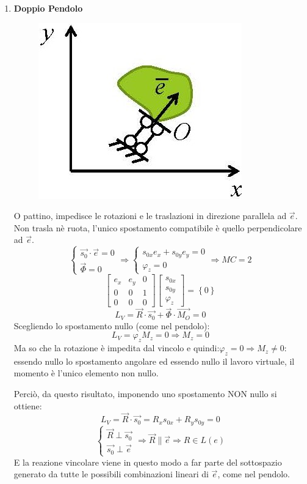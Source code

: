 \documentclass{article}
\begin{document}
\begin{adjustwidth}{2in}{}
\begin{enumerate}
\item \textbf{Doppio Pendolo}\newline
\begin{figure}[H]
	\centering
	\includegraphics[width=0.25\linewidth]{"immagini/1.PARTE1_Pagina_36"}
\end{figure}
O pattino, impedisce le rotazioni e le traslazioni in direzione parallela ad $\vec{e}$. Non trasla nè ruota, l'unico spostamento compatibile è quello perpendicolare ad $\vec{e}$.
\[ 
\begin{cases}
	\vec{s_{0}} \cdot \vec{e} = 0 \\
	\vec{\Phi} = 0
\end{cases}
\Rightarrow \begin{cases} s_{0x}e_{x} + s_{0y}e_{y}= 0 \\
	\varphi_{z} = 0 
\end{cases}\Rightarrow MC = 2
\]
	\[ 
\left[\begin{array}{ccc}
	e_{x} & e_{y} & 0 \\
	0 & 0 & 1 \\
	0 & 0 & 0
\end{array}\right] \left[ \begin{array}{c}
	s_{0x} \\
	s_{0y} \\
	\varphi_{z}
\end{array}\right] = \left\lbrace 0 \right\rbrace
\]
\[
L_{V} = \vec{R} \cdot \vec{s_{0}}  + \vec{\Phi} \cdot \vec{M_{O}} = 0
\]
Scegliendo lo spostamento nullo (come nel pendolo): 
\[
L_{V} =  \varphi_{z}M_{z} = 0 \Rightarrow M_{z} = 0
\]
Ma so che la rotazione è impedita dal vincolo e quindi:$\varphi_{z}=0 \Rightarrow M_{z} \ne 0$: essendo nullo lo spostamento angolare ed essendo nullo il lavoro virtuale, il momento è l'unico elemento non nullo.


Perciò, da questo risultato, imponendo uno spostamento NON nullo si ottiene: 
\[
L_{V} = \vec{R} \cdot \vec{s_{0}}  =  R_{x}s_{0x} + R_{y}s_{0y} = 0 
\]
\[ 
\begin{cases}
	\vec{R} \perp \vec{s_{0}} \\
	\vec{s_{0}} \perp \vec{e}
\end{cases} \Rightarrow \vec{R} \parallel \vec{e} \Rightarrow R \in L(e)
\]
E la reazione vincolare viene in questo modo a far parte del sottospazio generato da tutte le possibili combinazioni lineari di $\vec{e}$, come nel pendolo.


\end{enumerate}
\end{adjustwidth}
\end{document}
